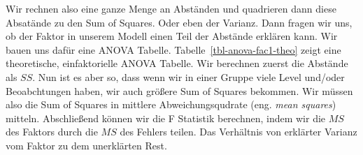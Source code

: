 \documentclass[
  letterpaper,
]{scrbook}
\begin{document}
Wir rechnen also eine ganze Menge an Abständen und quadrieren dann diese
Absatände zu den Sum of Squares. Oder eben der Varianz. Dann fragen wir
uns, ob der Faktor in unserem Modell einen Teil der Abstände erklären
kann. Wir bauen uns dafür eine ANOVA Tabelle.
Tabelle~\ref{tbl-anova-fac1-theo} zeigt eine theoretische,
einfaktorielle ANOVA Tabelle. Wir berechnen zuerst die Abstände als
\(SS\). Nun ist es aber so, dass wenn wir in einer Gruppe viele Level
und/oder Beoabchtungen haben, wir auch größere Sum of Squares bekommen.
Wir müssen also die Sum of Squares in mittlere Abweichungsqudrate (eng.
\emph{mean squares}) mitteln. Abschließend können wir die F Statistik
berechnen, indem wir die \(MS\) des Faktors durch die \(MS\) des Fehlers
teilen. Das Verhältnis von erklärter Varianz vom Faktor zu dem
unerklärten Rest.
\end{document}
